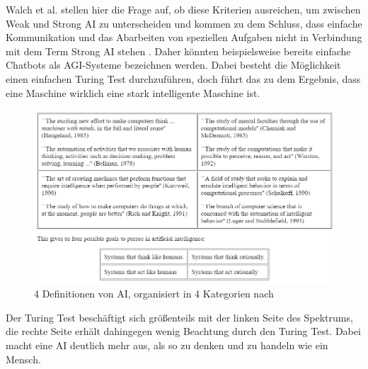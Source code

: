             Walch et al. stellen hier die Frage auf, ob diese Kriterien ausreichen, um zwischen Weak und Strong AI
            zu unterscheiden und kommen zu dem Schluss, dass einfache Kommunikation und das Abarbeiten von
            speziellen Aufgaben nicht in Verbindung mit dem Term Strong AI stehen \citeyearpar{walch_world_2019}.
            Daher könnten beispielsweise bereits einfache Chatbots als AGI-Systeme bezeichnen werden\cite{walch_world_2019}.
            Dabei besteht die Möglichkeit einen einfachen Turing Test durchzuführen, doch führt das zu dem Ergebnis,
            dass eine Maschine wirklich eine stark intelligente Maschine ist.
            \begin{figure}[h]
                \begin{center}
                    \includegraphics[width=1.0\textwidth]{figures/ai-definitions.png}
                    \caption[4 Definitionen AI]{4 Definitionen von AI, organisiert in 4 Kategorien nach \cite{russell}}
                    \label{pic:ai-definitions}
                \end{center}
            \end{figure}
            Der Turing Test beschäftigt sich größenteils mit der linken Seite des Spektrums, die rechte Seite erhält
            dahingegen wenig Beachtung durch den Turing Test. Dabei macht eine AI deutlich mehr aus, als so zu denken
            und zu handeln wie ein Mensch.


